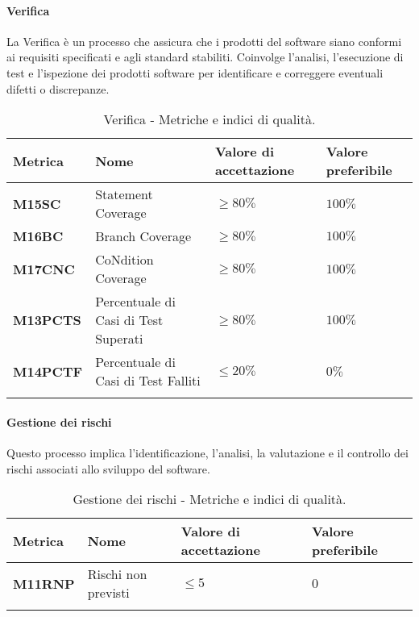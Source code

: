 \paragraph{Verifica}
La Verifica è un processo che assicura che i prodotti del software siano conformi ai requisiti specificati e agli standard stabiliti. Coinvolge l'analisi, l'esecuzione di test e l'ispezione dei prodotti software per identificare e correggere eventuali difetti o discrepanze.
\hspace{1pt}
\begin{longtable}{|C{1.5cm}|L{3cm}|L{2.5cm}|L{2.5cm}|}
    \hline
    \textbf{Metrica} & \textbf{Nome} & \textbf{Valore di accettazione} & \textbf{Valore preferibile} \\
    \hline
    \textbf{M15SC} & Statement Coverage & $\geq 80\%$ & $100\%$ \\
    \hline
    \textbf{M16BC} & Branch Coverage & $\geq 80\%$ & $100\%$ \\
    \hline
    \textbf{M17CNC} & CoNdition Coverage & $\geq 80\%$ & $100\%$ \\
    \hline
    \textbf{M13PCTS} & Percentuale di Casi di Test Superati & $\geq 80\%$ & $100\%$ \\
    \hline
    \textbf{M14PCTF} & Percentuale di Casi di Test Falliti & $\leq 20\%$ & $0\%$ \\
    \hline
\caption{Verifica - Metriche e indici di qualità.}
\label{tab:metriche_verifica}
\end{longtable}


\paragraph{Gestione dei rischi}
Questo processo implica l'identificazione, l'analisi, la valutazione e il controllo dei rischi associati allo sviluppo del software. 
\hspace{1pt}
    \begin{longtable}{|C{1.5cm}|L{3cm}|L{2.5cm}|L{2.5cm}|}
        \hline
      \textbf{Metrica} & \textbf{Nome} & \textbf{Valore di accettazione} & \textbf{Valore preferibile} \\
      \hline
      \textbf{M11RNP}    & Rischi non previsti  & $\leq 5$ &   $0$ \\
      \hline
    \caption{Gestione dei rischi - Metriche e indici di qualità.}
    \label{tab:tabella2}
\end{longtable}


